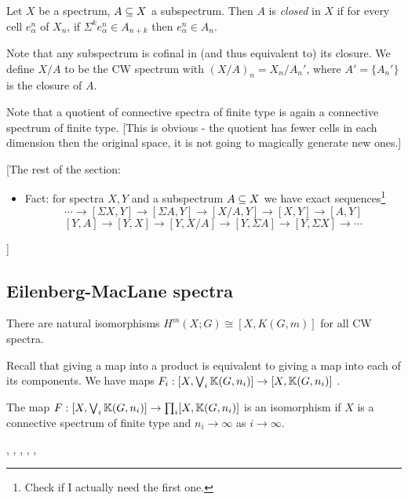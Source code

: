 \documentclass{MetricNotes2023}
\def\bb{\ensuremath\mathbb}
\def\subq{\ensuremath\subseteq}
\begin{document}
\begin{definition}
Let \(X\) be a spectrum, \(A\subq X\) a subspectrum. Then \(A\) is \textit{closed} in \(X\) if for every cell \(e_\alpha^n\) of \(X_n\), if \(\Sigma^k e_\alpha^n \in A_{n+k}\) then \(e_\alpha^n \in A_n\). 
\end{definition}

Note that any subspectrum is cofinal in (and thus equivalent to) its closure. We define \(X/A\) to be the CW spectrum with \((X/A)_n=X_n/A_n'\), where \(A'=\{A_n'\}\) is the closure of \(A\). 

Note that a quotient of connective spectra of finite type is again a connective spectrum of finite type. [This is obvious - the quotient has fewer cells in each dimension then the original space, it is not going to magically generate new ones.]

[The rest of the section:

\begin{itemize}
\item Fact: for spectra \(X, Y\) and a subspectrum \(A\subq X\) we have exact sequences\footnote{Check if I actually need the first one.}
\[\cdots \to [\Sigma X, Y]\to [\Sigma A, Y]\to [X/A,Y]\to[X,Y]\to[A,Y]\]
\[[Y,A]\to[Y,X]\to[Y,X/A]\to[Y,\Sigma A]\to[Y,\Sigma X]\to\cdots\]
\end{itemize}

]

\subsection{Eilenberg-MacLane spectra}

\begin{theorem}\label{2503221328}
There are natural isomorphisms \(H^m(X;G)\cong [X,K(G,m)]\) for all CW spectra.
\end{theorem}

Recall that giving a map into a product is equivalent to giving a map into each of its components. We have maps \(F_i : [X, \bigvee_i \bb{K}(G,n_i)]\to [X,\bb{K}(G,n_i)]\) .

\begin{proposition}\label{2503231218}
The map \(F : [X, \bigvee_i \bb{K}(G,n_i)]\to \prod_i [X,\bb{K}(G,n_i)]\) is an isomorphism if \(X\) is a connective spectrum of finite type and \(n_i\to \infty\) as \(i\to\infty\). 
\end{proposition}

\autocite{stable_homotopy}, \autocite{cobordism}, \autocite{ass}, \autocite{spectra}, \autocite{foundations}, \autocite{hatcher5}
\end{document}
